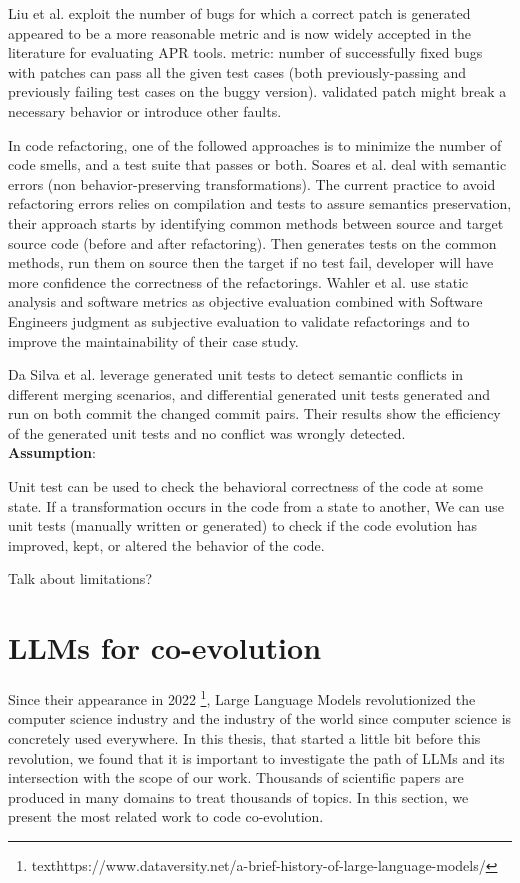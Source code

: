 Liu et al. \cite{LIU2021110817} exploit the number of bugs for which a correct patch is generated appeared to be a more reasonable metric and is now widely accepted in the literature for evaluating APR tools.  metric: number of successfully fixed bugs with patches can pass all the given test cases (both previously-passing and previously failing test cases on the buggy version). validated patch might break a necessary behavior or introduce other faults.

In code refactoring, one of the followed approaches is to minimize the number of code smells, and a test suite that passes or both.
Soares et al. \cite{soares2009generating} deal with semantic errors (non behavior-preserving transformations). The current practice to avoid refactoring errors relies on compilation and tests to assure semantics preservation, their approach starts by identifying common methods between source and target source code (before and after refactoring). Then generates tests on the common methods, run them on source then the target if no test fail, developer will have more confidence the correctness of the refactorings.
Wahler et al. \cite{7816501} use static analysis and software metrics as  objective evaluation combined with Software Engineers judgment as subjective evaluation to validate refactorings and to improve the maintainability of their case study.

Da Silva et al. \cite{DASILVA2024112070} leverage generated unit tests to detect semantic conflicts in different merging scenarios, and differential generated unit tests generated and run on both commit the changed commit pairs. Their results show the efficiency of the generated unit tests and no conflict was wrongly detected.
\\
\textbf{Assumption}:

Unit test can be used to check the behavioral correctness of the code at some state.
If a transformation occurs in the code from a state to another, We can use unit tests (manually written or generated) to check if the code evolution has improved, kept, or altered the behavior of the code.
 
 Talk about limitations?
  \section{LLMs for co-evolution }
  \label{llmsforcoevolution}
  Since their appearance in 2022 \footnote{texthttps://www.dataversity.net/a-brief-history-of-large-language-models/}, Large Language Models revolutionized the computer science industry and the industry of the world since computer science is concretely used everywhere. In this thesis, that started a little bit before this revolution, we found that it is important to investigate the path of LLMs and its intersection with the scope of our work. Thousands of scientific papers are produced in many domains to treat thousands of topics. In this section, we present the most related work to code co-evolution.
  
